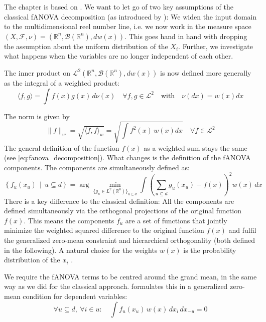 The chapter is based on \cite{hooker2007}. We want to let go of two key assumptions of the classical fANOVA decomposition (as introduced by \cite{sobol1993sensitivity}): We widen the input domain to the multidimensional reel number line, i.e. we now work in the measure space $(X, \mathcal{F}, \nu) = (\mathbb{R}^n, \mathcal{B}(\mathbb{R}^n), dw(x))$. This goes hand in hand with dropping the assumption about the uniform distribution of the $X_i$. Further, we investigate what happens when the variables are no longer independent of each other.\par
The inner product on $\mathcal{L}^2(\mathbb{R}^n, \mathcal{B}(\mathbb{R}^n), dw(x))$ is now defined more generally as the integral of a weighted product:
\[
\langle f, g \rangle = \int f(x) g(x) \, d\nu(x) \quad \forall f, g \in \mathcal{L}^2 \quad \text{with} \quad \nu(dx) = w(x)dx
\]

The norm is given by 
\[
\|f\|_{w} = \sqrt{\langle f, f \rangle_{w}} = \sqrt{\int f^2(x) \, w(x)dx} \quad \forall f \in \mathcal{L}^2
\]
The general definition of the function $f(x)$ as a weighted sum stays the same (see \autoref{eq:fanova_decomposition}). What changes is the definition of the fANOVA components. The components are simultaneously defined as:
\begin{equation}
\left\{ f_u(x_u) \,\middle|\, u \subseteq d \right\}
= \arg\min_{\{g_u \in L^2(\mathbb{R}^u)\}_{u \subseteq d}} 
\int \left( \sum_{u \subseteq d} g_u(x_u) - f(x) \right)^2 w(x) \, dx
\label{eq:fanova_decomposition_generalized}
\end{equation}
There is a key difference to the classical definition: All the components are defined simultaneously via the orthogonal projections of the original function $f(x)$. This means the components $f_u$ are a set of functions that jointly minimize the weighted squared difference to the original function $f(x)$ and fulfil the generalized zero-mean constraint and hierarchical orthogonality (both defined in the following). A natural choice for the weights $w(x)$ is the probability distribution of the $x_i$ \citep{hooker2007}.\par

We require the fANOVA terms to be centred around the grand mean, in the same way as we did for the classical approach.
\cite{hooker2007} formulates this in a generalized zero-mean condition for dependent variables:
\begin{equation}
\forall u \subseteq d,\ \forall i \in u: \quad 
\int f_u(x_u)\, w(x)\, dx_i\, dx_{-u} = 0
\label{eq:zero_mean_condition_generalized}
\end{equation}


